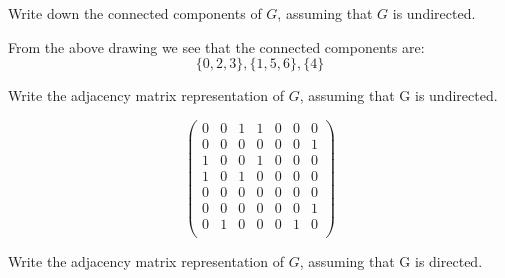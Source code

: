 \begin{prob}
\begin{subprobset}
\begin{subprob}
\begin{soln}
\begin{center}
                \end{center}

            \end{soln}
        \end{subprob}

        \begin{subprob}
            Write down the connected components of $G$, assuming that $G$ is undirected.

            \begin{soln}
                From the above drawing we see that the connected components
                are:
                \[
                    \{0, 2, 3\}, \{1, 5, 6\}, \{4\}
                \]
            \end{soln}
            
        \end{subprob}

        \begin{subprob}
            Write the adjacency matrix representation of $G$, assuming that G is undirected.

            \begin{soln}

                \[
                \begin{pmatrix}
                    0 & 0 & 1 & 1 & 0 & 0 & 0 \\
                    0 & 0 & 0 & 0 & 0 & 0 & 1 \\
                    1 & 0 & 0 & 1 & 0 & 0 & 0 \\
                    1 & 0 & 1 & 0 & 0 & 0 & 0 \\
                    0 & 0 & 0 & 0 & 0 & 0 & 0 \\
                    0 & 0 & 0 & 0 & 0 & 0 & 1 \\
                    0 & 1 & 0 & 0 & 0 & 1 & 0 \\
                \end{pmatrix}
                \]

            \end{soln}
        \end{subprob}

        \begin{subprob}
            Write the adjacency matrix representation of $G$, assuming that G is directed.


\end{subprob}
\end{subprobset}
\end{prob}

